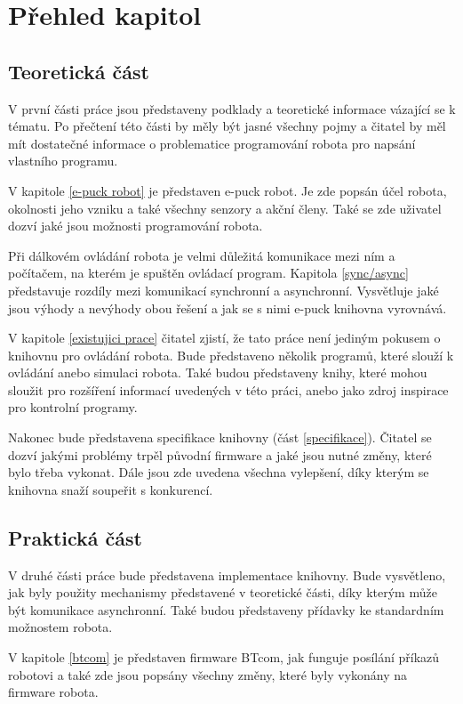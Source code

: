 \section*{Přehled kapitol}

\subsection*{Teoretická část}
V první části práce jsou představeny podklady a teoretické informace
vázající se k tématu. Po přečtení této části by měly být jasné všechny
pojmy a čitatel by měl mít dostatečné informace o problematice programování
robota pro napsání vlastního programu.

V kapitole \ref{e-puck robot} je představen e-puck robot. Je zde popsán
účel robota, okolnosti jeho vzniku a také všechny senzory a akční členy.
Také se zde uživatel dozví jaké jsou možnosti programování robota.

Při dálkovém ovládání robota je velmi důležitá komunikace mezi ním a
počítačem, na kterém je spuštěn ovládací program. Kapitola \ref{sync/async}
představuje rozdíly mezi komunikací synchronní a asynchronní. Vysvětluje
jaké jsou výhody a nevýhody obou řešení a jak se s nimi e-puck knihovna
vyrovnává.

V kapitole \ref{existujici prace} čitatel zjistí, že tato práce není
jediným pokusem o knihovnu pro ovládání robota. Bude představeno několik
programů, které slouží k ovládání anebo simulaci robota. Také budou
představeny knihy, které mohou sloužit pro rozšíření informací uvedených v
této práci, anebo jako zdroj inspirace pro kontrolní programy.

Nakonec bude představena specifikace knihovny (část \ref{specifikace}).
Čitatel se dozví jakými problémy trpěl původní firmware a jaké jsou nutné
změny, které bylo třeba vykonat. Dále jsou zde uvedena všechna vylepšení,
díky kterým se knihovna snaží soupeřit s konkurencí.

\subsection*{Praktická část}
V druhé části práce bude představena implementace knihovny. Bude
vysvětleno, jak byly použity mechanismy představené v teoretické části,
díky kterým může být komunikace asynchronní. Také budou představeny
přídavky ke standardním možnostem robota.

V kapitole \ref{btcom} je představen firmware BTcom, jak funguje posílání
příkazů robotovi a také zde jsou popsány všechny změny, které byly vykonány
na firmware robota.

